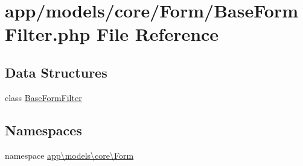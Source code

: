 \hypertarget{_base_form_filter_8php}{\section{app/models/core/\-Form/\-Base\-Form\-Filter.php File Reference}
\label{_base_form_filter_8php}
}
\subsection*{Data Structures}
\begin{DoxyCompactItemize}
\item 
class \hyperlink{classapp_1_1models_1_1core_1_1_form_1_1_base_form_filter}{Base\-Form\-Filter}
\end{DoxyCompactItemize}
\subsection*{Namespaces}
\begin{DoxyCompactItemize}
\item 
namespace \hyperlink{namespaceapp_1_1models_1_1core_1_1_form}{app\textbackslash{}models\textbackslash{}core\textbackslash{}\-Form}
\end{DoxyCompactItemize}
